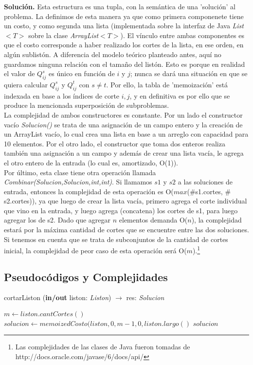 \textbf{Solución.} Esta estructura es una tupla, con la semántica de una 'solución' al problema. La definimos de esta manera ya que como primera componenete tiene un costo, y como segunda una lista (implementada sobre la interfaz de Java \textsl{List$<T>$} sobre la clase \textsl{ArrayList$<T>$}). El vínculo entre ambas componentes es que el costo corresponde a haber realizado los cortes de la lista, en ese orden, en algún sublistón. A diferencia del modelo teórico planteado antes, aquí no guardamos ninguna relación con el tamaño del listón. Esto es porque en realidad el valor de $Q^{s}_{ij}$ es único en función de $i$ y $j$; nunca se dará una situación en que se quiera calcular $Q^{s}_{ij}$ y $Q^{t}_{ij}$ con $ s \neq t$. Por ello, la tabla de 'memoización' está indexada en base a los índices de corte $i,j$, y en definitiva es por ello que se produce la mencionada superposición de subproblemas.\\
\indent La complejidad de ambos constructores es constante. Por un lado el constructor vacío \textit{Solucion()} se trata de una asignación de un campo entero y la creación de un ArrayList vacío, lo cual crea una lista en base a un arreglo con capacidad para 10 elementos. Por el otro lado, el constructor que toma dos enteros realiza también una asignación a un campo y además de crear una lista vacía, le agrega el otro entero de la entrada (lo cual es, amortizado, O(1)).\\
\indent Por último, esta clase tiene otra operación llamada \textit{Combinar(Solucion,Solucion,int,int)}. Si llamamos $s1$ y $s2$ a las soluciones de entrada, entonces la complejidad de esta operación es O($max$($\#$s1.cortes, $\#$s2.cortes)), ya que luego de crear la lista vacía, primero agrega el corte individual que vino en la entrada, y luego agrega (concatena) los cortes de s1, para luego agregar los de s2. Dado que agregar $n$ elementos demanda O($n$), la complejidad estará por la máxima cantidad de cortes que se encuentre entre las dos soluciones. Si tenemos en cuenta que se trata de subconjuntos de la cantidad de cortes inicial, la complejidad de peor caso de esta operación será O($m$).\footnote{Las complejidades de las clases de Java fueron tomadas de http://docs.oracle.com/javase/6/docs/api/}

\subsection{Pseudocódigos y Complejidades}

\begin{algorithm}
\caption{cortarListon (\textbf{in/out} liston: \textsl{Liston}) $\rightarrow$ res: \textsl{Solucion}}
\begin{algorithmic}[1]

\STATE $ m \leftarrow liston.cantCortes()$
\STATE $ solucion \leftarrow memoizedCosto(liston,0,m-1,0,liston.largo()$
\RETURN $solucion$

\end{algorithmic}
\end{algorithm}

